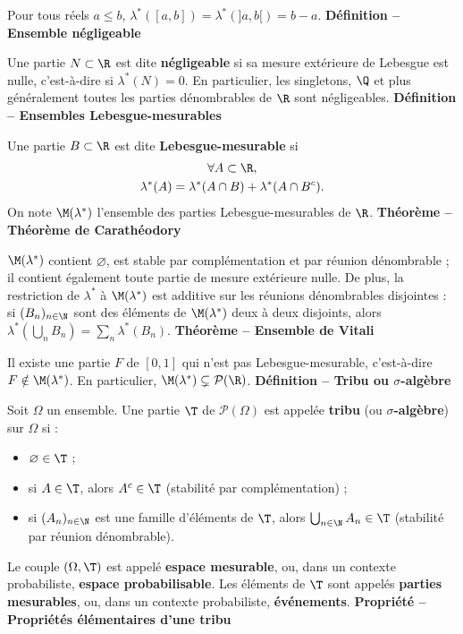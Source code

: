 Pour tous réels $a\le b$, $\lambda^*([a,b])=\lambda^*(]a,b[)=b-a$.
\textbf{Définition – Ensemble négligeable}

Une partie $N\subset\R$ est dite \textbf{négligeable} si sa mesure extérieure de Lebesgue est nulle, c’est-à-dire si $\lambda^*(N)=0$. En particulier, les singletons, $\Q$ et plus généralement toutes les parties dénombrables de $\R$ sont négligeables.
\textbf{Définition – Ensembles Lebesgue-mesurables}

Une partie $B\subset\R$ est dite \textbf{Lebesgue-mesurable} si
\[
\begin{gathered}
\forall A\subset\R,\\
\lambda^*(A)=\lambda^*(A\cap B)+\lambda^*(A\cap B^c).
\end{gathered}
\]
On note $\M(\lambda^*)$ l’ensemble des parties Lebesgue-mesurables de $\R$.
\textbf{Théorème – Théorème de Carathéodory}

$\M(\lambda^*)$ contient $\varnothing$, est stable par complémentation et par réunion dénombrable ; il contient également toute partie de mesure extérieure nulle. De plus, la restriction de $\lambda^*$ à $\M(\lambda^*)$ est additive sur les réunions dénombrables disjointes : si $(B_n)_{n\in\N}$ sont des éléments de $\M(\lambda^*)$ deux à deux disjoints, alors $\lambda^*(\bigcup_n B_n)=\sum_n\lambda^*(B_n)$.
\textbf{Théorème – Ensemble de Vitali}

Il existe une partie $F$ de $[0,1]$ qui n’est pas Lebesgue-mesurable, c’est-à-dire $F\notin\M(\lambda^*)$. En particulier, $\M(\lambda^*)\subsetneq\mathcal P(\R)$.
\textbf{Définition – Tribu ou $\sigma$-algèbre}

Soit $\Omega$ un ensemble. Une partie $\T$ de $\mathcal P(\Omega)$ est appelée \textbf{tribu} (ou \textbf{$\sigma$-algèbre}) sur $\Omega$ si :
\begin{itemize}
\item $\varnothing\in\T$ ;
\item si $A\in\T$, alors $A^c\in\T$ (stabilité par complémentation) ;
\item si $(A_n)_{n\in\N}$ est une famille d’éléments de $\T$, alors $\bigcup_{n\in\N}A_n\in\T$ (stabilité par réunion dénombrable).
\end{itemize}
Le couple $(\Omega,\T)$ est appelé \textbf{espace mesurable}, ou, dans un contexte probabiliste, \textbf{espace probabilisable}. Les éléments de $\T$ sont appelés \textbf{parties mesurables}, ou, dans un contexte probabiliste, \textbf{événements}.
\textbf{Propriété – Propriétés élémentaires d’une tribu}

